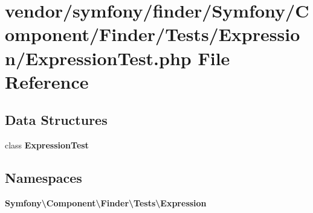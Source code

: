 \section{vendor/symfony/finder/\+Symfony/\+Component/\+Finder/\+Tests/\+Expression/\+Expression\+Test.php File Reference}
\label{_expression_test_8php}
\subsection*{Data Structures}
\begin{DoxyCompactItemize}
\item 
class {\bf Expression\+Test}
\end{DoxyCompactItemize}
\subsection*{Namespaces}
\begin{DoxyCompactItemize}
\item 
 {\bf Symfony\textbackslash{}\+Component\textbackslash{}\+Finder\textbackslash{}\+Tests\textbackslash{}\+Expression}
\end{DoxyCompactItemize}
